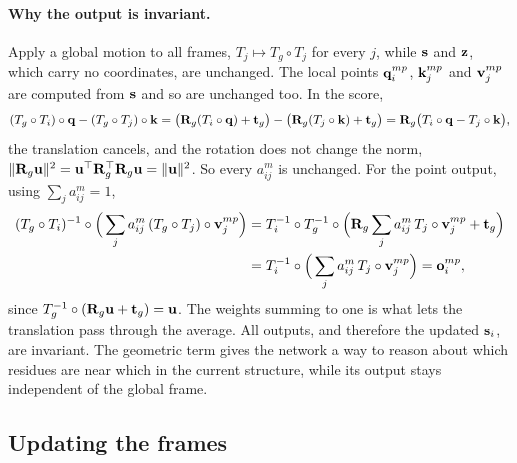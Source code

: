 \paragraph{Why the output is invariant.} Apply a global motion to all frames, $T_j\mapsto T_g\circ T_j$ for every $j$, while $\mathbf{s}$ and $\mathbf{z}$, which carry no coordinates, are unchanged. The local points $\mathbf{q}^{mp}_i$, $\mathbf{k}^{mp}_j$ and $\mathbf{v}^{mp}_j$ are computed from $\mathbf{s}$ and so are unchanged too. In the score,
\begin{equation}
  (T_g\circ T_i)\circ\mathbf{q} - (T_g\circ T_j)\circ\mathbf{k} = \big(\mathbf{R}_g(T_i\circ\mathbf{q})+\mathbf{t}_g\big) - \big(\mathbf{R}_g(T_j\circ\mathbf{k})+\mathbf{t}_g\big) = \mathbf{R}_g\big(T_i\circ\mathbf{q} - T_j\circ\mathbf{k}\big),
\end{equation}
the translation cancels, and the rotation does not change the norm, $\|\mathbf{R}_g\mathbf{u}\|^2=\mathbf{u}^\top\mathbf{R}_g^\top\mathbf{R}_g\mathbf{u}=\|\mathbf{u}\|^2$. So every $a^m_{ij}$ is unchanged. For the point output, using $\sum_j a^m_{ij}=1$,
\begin{align}
  (T_g\circ T_i)^{-1}\circ\Big(\sum_j a^m_{ij}\,(T_g\circ T_j)\circ\mathbf{v}^{mp}_j\Big)
  &= T_i^{-1}\circ T_g^{-1}\circ\Big(\mathbf{R}_g\sum_j a^m_{ij}\,T_j\circ\mathbf{v}^{mp}_j + \mathbf{t}_g\Big) \nonumber\\
  &= T_i^{-1}\circ\Big(\sum_j a^m_{ij}\,T_j\circ\mathbf{v}^{mp}_j\Big) = \mathbf{o}^{mp}_i ,
\end{align}
since $T_g^{-1}\circ(\mathbf{R}_g\mathbf{u}+\mathbf{t}_g)=\mathbf{u}$. The weights summing to one is what lets the translation pass through the average. All outputs, and therefore the updated $\mathbf{s}_i$, are invariant. The geometric term gives the network a way to reason about which residues are near which in the current structure, while its output stays independent of the global frame.

\subsection{Updating the frames}

